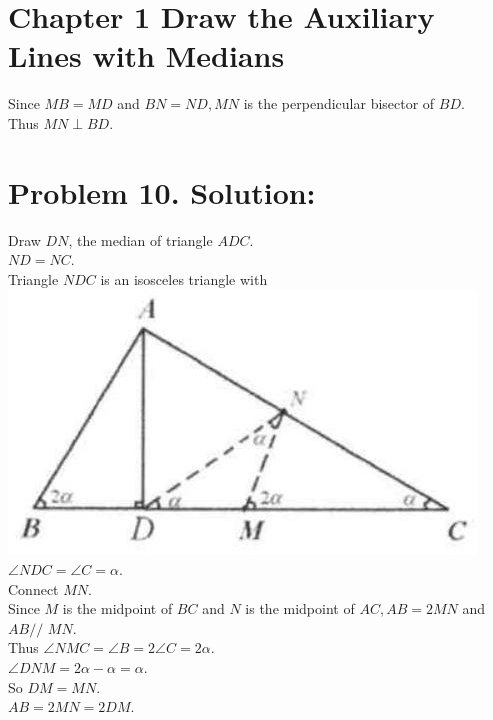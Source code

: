 \documentclass[10pt]{article}
\begin{document}
\section*{Chapter 1 Draw the Auxiliary Lines with Medians}
Since \(M B=M D\) and \(B N=N D, M N\) is the perpendicular bisector of \(B D\).\\
Thus \(M N \perp B D\).

\section*{Problem 10. Solution:}
Draw \(D N\), the median of triangle \(A D C\).\\
\(N D=N C\).\\
Triangle \(N D C\) is an isosceles triangle with\\
\includegraphics[max width=\textwidth]{2025_04_17_97bc1f7e44d93c271a88g-021(1)} \(\angle N D C=\angle C=\alpha\).\\
Connect \(M N\).\\
Since \(M\) is the midpoint of \(B C\) and \(N\) is the midpoint of \(A C, A B=2 M N\) and \(A B / /\) \(M N\).\\
Thus \(\angle N M C=\angle B=2 \angle C=2 \alpha\).\\
\(\angle D N M=2 \alpha-\alpha=\alpha\).\\
So \(D M=M N\).\\
\(A B=2 M N=2 D M\).
\end{document}

